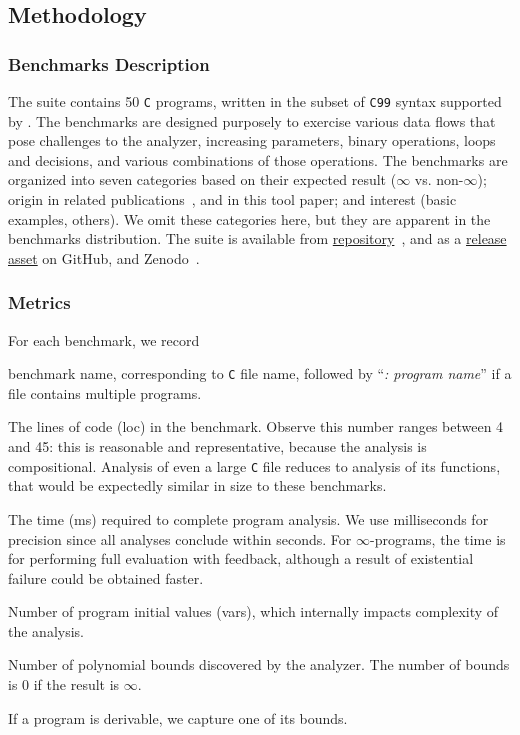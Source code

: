 \documentclass[runningheads]{llncs}
\begin{document}
\subsection{Methodology}
\label{subsec:methods}  %

\subsubsection{Benchmarks Description}

The suite contains 50 \texttt{C} programs, written in the subset of \texttt{C99} syntax supported by \pymwp.
The benchmarks are designed purposely to exercise various data flows that pose challenges to the analyzer,
\eg increasing parameters, binary operations, loops and decisions, and various combinations of those operations.
The benchmarks are organized into seven categories based on their expected result ($\infty$ vs. non-$\infty$);
origin in related publications~\cite{Aubert2022b,Jones2009}, and in this tool paper;
and interest (basic examples, others).
We omit these categories here, but they are apparent in the benchmarks distribution.
The suite is available from \href{https://github.com/statycc/pymwp/tree/c6887d8e8a2c2b0e2a6b7ad960851ec693c603d3/c_files}{\pymwp repository}~\cite{pymwp_source}, 
and as a \href{https://github.com/statycc/pymwp/releases/download/0.4.2/examples.zip}{release asset} on GitHub, and Zenodo~\cite{pymwp}.

\subsubsection{Metrics}

For each benchmark, we record
\begin{enumerate*}
\item benchmark name, corresponding to \texttt{C} file name, followed by \enquote{\emph{: program name}} if a file contains multiple programs.
\item The lines of code (loc) in the benchmark.
Observe this number ranges between 4 and 45: this is reasonable and representative, because the analysis is compositional.
Analysis of even a large \texttt{C} file reduces to analysis of its functions, that would be expectedly similar in size to these benchmarks.
\item The time (ms) required to complete program analysis.
We use milliseconds for precision since all analyses conclude within seconds.
For $\infty$-programs, the time is for performing full evaluation with feedback, although a result of existential failure could be obtained faster.
\item Number of program initial values (vars), which internally impacts complexity of the analysis.
\item Number of polynomial bounds discovered by the analyzer.
The number of bounds is 0 if the result is $\infty$.
\item If a program is derivable, we capture one of its bounds.
\end{enumerate*}
\end{document}
